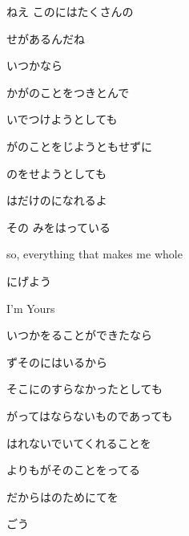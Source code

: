 \documentclass[14pt]{ltjsarticle}
\begin{document}
{\item
  ねえ このにはたくさんの
  \jisho{}

  せがあるんだね
  \jisho{}

  いつかなら
  \jisho{}

\item
  かがのことをつきとんで
  \jisho{}

  いでつけようとしても
  \jisho{}

  がのことをじようともせずに
  \jisho{}

  のをせようとしても
  \jisho{}

  はだけのになれるよ
  \jisho{}

  その みをはっている
  \jisho{}

  so, everything that makes me whole
  \jisho{}

  にげよう
  \jisho{}

  I'm Yours
  \jisho{}

\item
  いつかをることができたなら
  \jisho{}

  ずそのにはいるから
  \jisho{}

  そこにのすらなかったとしても
  \jisho{}

  がってはならないものであっても
  \jisho{}

  はれないでいてくれることを
  \jisho{}

  よりもがそのことをってる
  \jisho{}

  だからはのためにてを
  \jisho{}

   ごう
  \jisho{}

  
}
\end{document}
